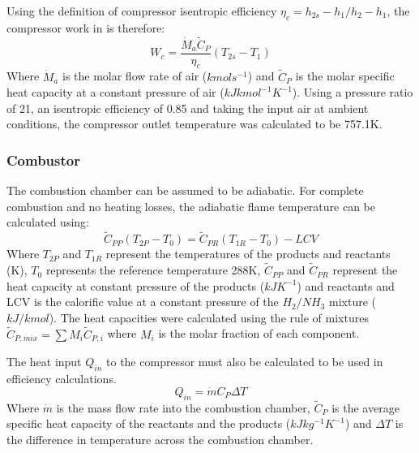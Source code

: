 \documentclass[11pt, oneside]{article}
\begin{document}
Using the definition of compressor isentropic efficiency $\eta_c = {h_{2s} - h_1}/{h_2 - h_1} $, the compressor work in is therefore:
\begin{equation}
W_{c} = \frac {\dot{M}_a \tilde{C}_P}{\eta_c} (T_{2s} - T_1)
\end{equation}
Where $\dot{M}_a$ is the molar flow rate of air ($kmols^{-1}$) and $\tilde{C}_P$ is the molar specific heat capacity at a constant pressure of air ($kJkmol^{-1}K^{-1}$). Using a pressure ratio of 21, an isentropic efficiency of 0.85 and taking the input air at ambient conditions, the compressor outlet temperature was calculated to be 757.1K.  

\subsubsection{Combustor} 
The combustion chamber can be assumed to be adiabatic. For complete combustion and no heating losses, the adiabatic flame temperature can be calculated using:
\begin{equation}
\tilde{C}_{PP} (T_{2P} - T_0) = \tilde{C}_{PR} (T_{1R} - T_0) - LCV 
\end{equation}
Where $T_{2P}$ and $T_{1R}$ represent the temperatures of the products and reactants (K), $T_0$ represents the reference temperature 288K, $\tilde{C}_{PP}$ and $\tilde{C}_{PR}$ represent the heat capacity at constant pressure of the products ($kJK^{-1}$) and reactants and LCV is the calorific value at a constant pressure of the $H_2/NH_3$ mixture ($kJ/kmol$). The heat capacities were calculated using the rule of mixtures $\tilde{C}_{P, mix} = \sum\nolimits M_i \tilde{C}_{P, i}$ where $M_i$ is the molar fraction of each component. %

The heat input $Q_{in}$ to the compressor must also be calculated to be used in efficiency calculations.
\begin{equation} \label{eq:heatequation}
Q_{in} = \dot{m}C_P\Delta T
\end{equation}
Where $\dot{m}$ is the mass flow rate into the combustion chamber, $\tilde{C}_P$ is the average specific heat capacity of the reactants and the products ($kJ kg^{-1} K^{-1}$) and $\Delta T$ is the difference in temperature across the combustion chamber.
\end{document}
